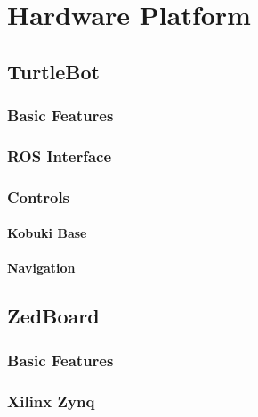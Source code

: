 \documentclass[thesis.tex]{subfile}
\begin{document}
\chapter{Hardware Platform} \label{Hardware Platform}
\section{TurtleBot}
\subsection{Basic Features}
\subsection{ROS Interface}
\subsection{Controls}
\subsubsection{Kobuki Base}
\subsubsection{Navigation}
\section{ZedBoard}
\subsection{Basic Features}
\subsection{Xilinx Zynq}
\end{document}
